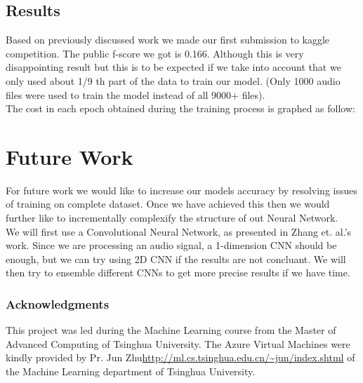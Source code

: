 \documentclass{article} %
\begin{document}
        \subsection{Results}
        Based on previously discussed work we made our first submission to kaggle competition. The public f-score we got is 0.166. Although this is very disappointing result but this is to be expected if we take into account that we only used about 1/9 th part of the data to train our model. (Only 1000 audio files were used to train the model instead of all 9000+ files).\\
        \newline
        The cost in each epoch obtained during the training process is graphed as follow:\\


\section{Future Work}
	For future work we would like to increase our models accuracy by resolving issues of training on complete dataset. Once we have achieved this then we would further like to incrementally complexify the structure of out Neural Network.\\
	\newline
    We will first use a Convolutional Neural Network, as presented in Zhang et. al.'s work\cite{cite6}. Since we are processing an audio signal, a 1-dimension CNN should be enough, but we can try using 2D CNN if the results are not concluant. We will then try to ensemble different CNNs to get more precise results if we have time.

\subsubsection*{Acknowledgments}

	This project was led during the Machine Learning course from the Master of Advanced Computing of Tsinghua University. The Azure Virtual Machines were kindly provided by Pr. Jun Zhu\url{http://ml.cs.tsinghua.edu.cn/~jun/index.shtml} of the Machine Learning department of Tsinghua University.

\nocite{*}


\end{document}
